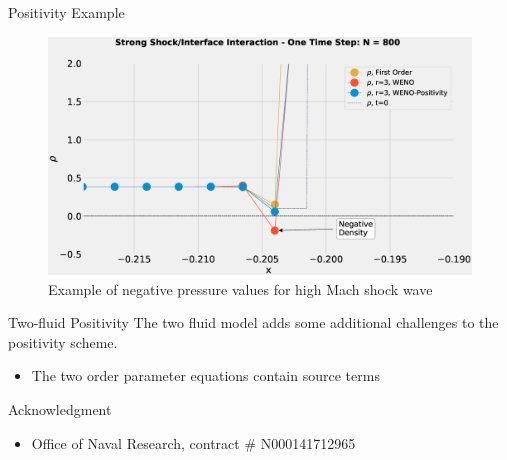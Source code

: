 \documentclass[9pt]{beamer}
\begin{document}
\begin{frame}{Positivity Example}
  \begin{figure}[H]
    \centering
    \includegraphics[scale=0.275]{PositivityZoomDenstiy.eps}\caption{Example of negative pressure values for high Mach shock wave}
    \end{figure}
\end{frame}


\begin{frame}{Two-fluid Positivity}
  The two fluid model adds some additional challenges to the positivity scheme.
  \begin{itemize}
    \item The two order parameter equations contain source terms
  \end{itemize}
\end{frame}

\begin{frame}{Acknowledgment}
  \begin{itemize}
  \item
    Office of Naval Research, contract $\#$ N000141712965
  \end{itemize}  
  
\end{frame}  
\end{document}
